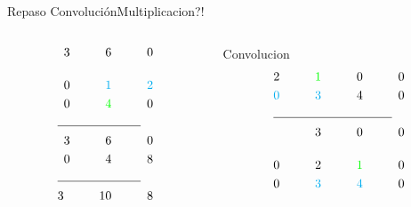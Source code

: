 \begin{frame}{Repaso Convolución}{Multiplicacion?!}
\begin{columns}[t]
\begin{column}{.3\textwidth}
\begin{align*}
               3\hspace{1cm} 6 \hspace{1cm}0\\[0.4cm]
               0\hspace{1cm}\textcolor{cyan} {1} \hspace{1cm}\textcolor{cyan}{2}\\
               0\hspace{1cm}\textcolor{green}{4} \hspace{1cm}                 0\\
               \cline{1-2}
               3\hspace{1cm} 6 \hspace{1cm}0\\
               0\hspace{1cm} 4 \hspace{1cm}8\\
               \cline{1-2}
               3 \hspace{1cm}10 \hspace{1cm} 8\\
            \end{align*}
      \end{column}
      \hspace{2pt}
      \vrule
      \hspace{2pt}
      \begin{column}{.3\textwidth}
      \tiny
      Convolucion
            \begin{align*}
                                2 \hspace{1cm} \textcolor{green}{1}\hspace{1cm}0 \hspace{1cm}0\\
               \textcolor{cyan}{0}\hspace{1cm} \textcolor{cyan} {3}\hspace{1cm}4 \hspace{1cm}0\\
               \cline{1-2}
               3\hspace{1cm} 0\hspace{1cm}0\\[0.4cm]
               0\hspace{1cm}                  2 \hspace{1cm}\textcolor{green}{1} \hspace{1cm}0\\
               0\hspace{1cm} \textcolor{cyan}{3}\hspace{1cm}\textcolor{cyan} {4} \hspace{1cm}0\\

\end{align*}
\end{column}
\end{columns}
\end{frame}
